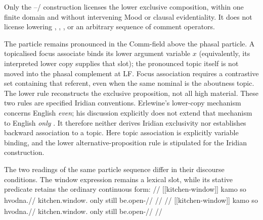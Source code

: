 Only the --/ construction licenses the
lower exclusive composition, within one finite domain and without intervening Mood or
clausal evidentiality. It does not license lowering , ,
, or an arbitrary sequence of comment operators.

The particle remains pronounced in the Comm-field above the phasal particle.
A topicalised focus associate binds its lower argument
variable $x$ (equivalently, its interpreted lower copy supplies that slot);
the pronounced topic itself is not moved into the phasal complement at LF.
Focus association requires a contrastive set containing that referent, even
when the same nominal is the aboutness topic. The lower rule reconstructs the
exclusive proposition, not all high material. These two rules are specified
Iridian conventions. Erlewine's lower-copy mechanism concerns English
\textit{even}; his discussion explicitly does not extend that mechanism to
English \textit{only} \cite[p.~863, fn.~9]{erlewine2016copies}. It therefore
neither derives Iridian exclusivity nor establishes backward association to a
topic. Here topic association is explicitly variable binding, and the lower
alternative-proposition rule is stipulated for the Iridian construction.

The two readings of the same particle sequence differ in their discourse
conditions. The window expression remains a lexical slot, while its stative
predicate retains the ordinary continuous form:
\pex\label{ex:kamo-so-window-scope}
\a
\begingl
\glpreamble {}//
\gla \textnormal{[[kitchen-window]]}\textsubscript{\Dir{}} kamo so hvodna.//
\glb kitchen.window.\Dir{} only still be.open-\Cont{}//
\glft {}//
\endgl
\a
\begingl
\glpreamble {}//
\gla \textnormal{[[kitchen-window]]}\textsubscript{\Dir{}} kamo so hvodna.//
\glb kitchen.window.\Dir{} only still be.open-\Cont{}//
\glft {}//
\endgl
\xe

